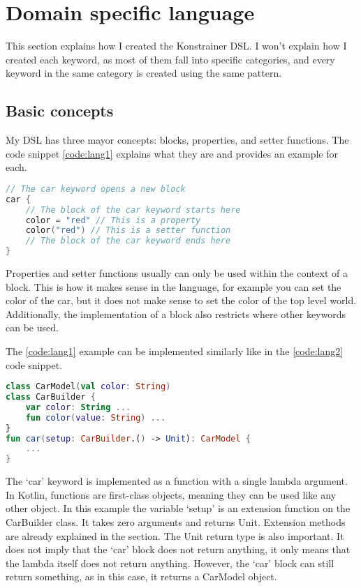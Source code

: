 \section{Domain specific language}
\label{sec:dsl}

This section explains how I created the Konstrainer DSL. I won't explain how I created each keyword, as most of them fall into specific categories, and every keyword in the same category is created using the same pattern.

\subsection{Basic concepts}

My DSL has three mayor concepts: blocks, properties, and setter functions. The code snippet \ref{code:lang1} explains what they are and provides an example for each.

\begin{lstlisting}[caption={Language concepts},language=Kotlin,label=code:lang1]
// The car keyword opens a new block
car { 
    // The block of the car keyword starts here
    color = "red" // This is a property
    color("red") // This is a setter function
    // The block of the car keyword ends here
}
\end{lstlisting}

Properties and setter functions usually can only be used within the context of a block. This is how it makes sense in the language, for example you can set the color of the car, but it does not make sense to set the color of the top level world. Additionally, the implementation of a block also restricts where other keywords can be used.

The \ref{code:lang1} example can be implemented similarly like in the \ref{code:lang2} code snippet.

\begin{lstlisting}[caption={Basic idea behind a block},language=Kotlin,label=code:lang2]
class CarModel(val color: String)
class CarBuilder {
    var color: String ...
    fun color(value: String) ...
}
fun car(setup: CarBuilder.() -> Unit): CarModel {
    ...
}
\end{lstlisting}

The `car' keyword is implemented as a function with a single lambda argument. In Kotlin, functions are first-class objects, meaning they can be used like any other object. In this example the variable `setup' is an extension function on the CarBuilder class. It takes zero arguments and returns Unit. Extension methods are already explained in the  section. The Unit return type is also important. It does not imply that the `car' block does not return anything, it only means that the lambda itself does not return anything. However, the `car' block can still return something, as in this case, it returns a CarModel object.


